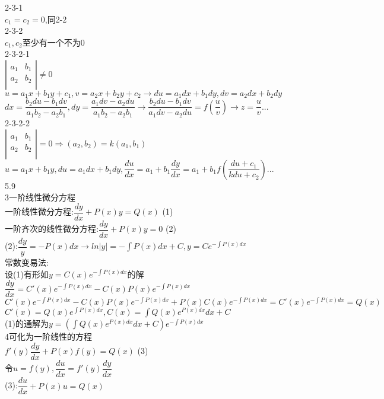 \documentclass[11pt, a4paper, UTF8]{ctexart}
\begin{document}
2-3-1\\
$ c_1=c_2=0 $,同2-2\\
2-3-2\\
$ c_1,c_2 $至少有一个不为0\\
2-3-2-1\\
$
\left|
\begin{array}{cc}
a_1&b_1\\
a_2&b_2\\
\end{array}
\right|\not=0
$\\
$ u=a_1x+b_1y+c_1,v=a_2x+b_2y+c_2\to du=a_1dx+b_1dy,dv=a_2dx+b_2dy $\\
$dx=\dfrac{b_2du-b_1dv}{a_1b_2-a_2b_1},dy=\dfrac{a_1dv-a_2du}{a_1b_2-a_2b_1}\to\dfrac{b_2du-b_1dv}{a_1dv-a_2du}=f(\dfrac{u}{v})\to z=\dfrac{u}{v}...$\\
2-3-2-2\\
$
\left|
\begin{array}{cc}
a_1&b_1\\
a_2&b_2\\
\end{array}
\right|=0\Rightarrow(a_2,b_2)=k(a_1,b_1)
$\\
$u=a_1x+b_1y,du=a_1dx+b_1dy,\dfrac{du}{dx}=a_1+b_1\dfrac{dy}{dx}=a_1+b_1f(\dfrac{du+c_1}{kdu+c_2})...$\\
5.9\\
3一阶线性微分方程\\
一阶线性微分方程:$ \dfrac{dy}{dx}+P(x)y=Q(x) $ (1)\\
一阶齐次的线性微分方程:$ \dfrac{dy}{dx}+P(x)y=0 $ (2)\\
(2):$ \dfrac{dy}{y}=-P(x)dx\to ln|y|=-\int P(x)dx+C,y=Ce^{-\int P(x)dx} $\\
常数变易法:\\
设(1)有形如$ y=C(x)e^{-\int P(x)dx} $的解\\
$ \dfrac{dy}{dx}=C'(x)e^{-\int P(x)dx}-C(x)P(x)e^{-\int P(x)dx} $\\
$ C'(x)e^{-\int P(x)dx}-C(x)P(x)e^{-\int P(x)dx}+P(x)C(x)e^{-\int P(x)dx}=C'(x)e^{-\int P(x)dx}=Q(x) $\\
$ C'(x)=Q(x)e^{\int P(x)dx},C(x)=\int Q(x)e^{P(x)dx}dx+C $\\
(1)的通解为$ y=(\int Q(x)e^{P(x)dx}dx+C)e^{-\int P(x)dx} $\\
4可化为一阶线性的方程\\
$ f'(y)\dfrac{dy}{dx}+P(x)f(y)=Q(x) $ (3)\\
令$ u=f(y),\dfrac{du}{dx}=f'(y)\dfrac{dy}{dx} $\\
(3):$ \dfrac{du}{dx}+P(x)u=Q(x) $\\
\end{document}
